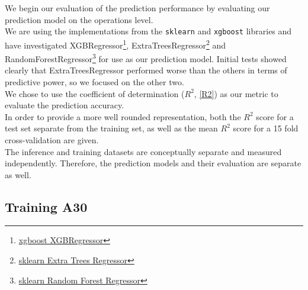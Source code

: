 We begin our evaluation of the prediction performance by evaluating our prediction model on the operations level. \\
We are using the implementations from the \texttt{sklearn} and \texttt{xgboost} libraries and have investigated XGBRegressor\footnote{\href{https://xgboost.readthedocs.io/en/latest/python/index.html}{xgboost XGBRegressor} }, ExtraTreesRegressor\footnote{\href{https://scikit-learn.org/stable/modules/generated/sklearn.ensemble.ExtraTreesRegressor.html}{sklearn Extra Trees Regressor} } and RandomForestRegressor\footnote{\href{https://scikit-learn.org/stable/modules/generated/sklearn.ensemble.RandomForestRegressor.html}{sklearn Random Forest Regressor} } for use as our prediction model. Initial tests showed clearly that ExtraTreesRegressor performed worse than the others in terms of predictive power, so we focused on the other two. \\
We chose to use the coefficient of determination ($R^2$, \ref{R2}) as our metric to evaluate the prediction accuracy. \\
In order to provide a more well rounded representation, both the $R^2$ score for a test set separate from the training set, as well as the mean $R^2$ score for a 15 fold cross-validation are given. \\
The inference and training datasets are conceptually separate and measured independently. Therefore, the prediction models and their evaluation are separate as well.










\subsection{Training A30}



